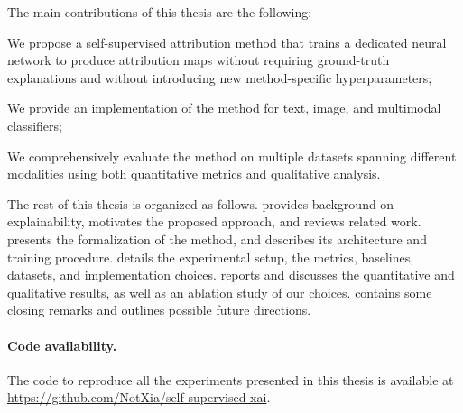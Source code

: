 The main contributions of this thesis are the following:
\begin{enumerate*}
    \item We propose a self-supervised attribution method that trains a dedicated neural network to produce attribution maps without requiring ground-truth explanations and without introducing new method-specific hyperparameters;
    \item We provide an implementation of the method for text, image, and multimodal classifiers;
    \item We comprehensively evaluate the method on multiple datasets spanning different modalities using both quantitative metrics and qualitative analysis.
\end{enumerate*}

The rest of this thesis is organized as follows.  provides background on explainability, motivates the proposed approach, and reviews related work.  presents the formalization of the method, and describes its architecture and training procedure.  details the experimental setup, the metrics, baselines, datasets, and implementation choices.  reports and discusses the quantitative and qualitative results, as well as an ablation study of our choices.  contains some closing remarks and outlines possible future directions.


\paragraph{Code availability.} The code to reproduce all the experiments presented in this thesis is available at \url{https://github.com/NotXia/self-supervised-xai}.